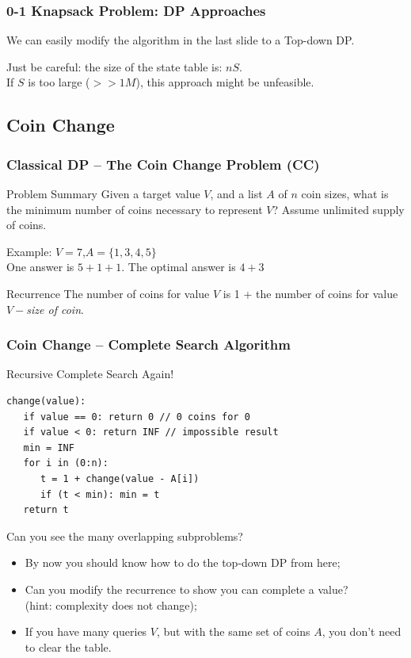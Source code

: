 \documentclass{beamer}
\begin{document}
\begin{frame}
  \frametitle{0-1 Knapsack Problem: DP Approaches} 

  {\small 
    We can easily modify the algorithm in the last slide to a Top-down
    DP.

    \bigskip

    \alert{Just be careful}: the size of the state table is: $nS$.\\ 
    If $S$ is too large ($>>1M$), this approach might be unfeasible.
  }
\end{frame}

\subsection{Coin Change}
\begin{frame}
  \frametitle{Classical DP -- The Coin Change Problem (CC)}
  \begin{block}{Problem Summary}
    Given a target value $V$, and a list $A$ of $n$ coin sizes, what
    is the minimum number of coins necessary to represent $V$? Assume
    unlimited supply of coins.
  \end{block}

  Example: $V = 7$,$A = \{1,3,4,5\}$\\
  \medskip
  One answer is $5+1+1$. The optimal answer is $4+3$

  \bigskip

  \begin{exampleblock}{Recurrence}
    The number of coins for value $V$ is 1 + the number of coins for
    value $V - $\emph{size of coin}.
  \end{exampleblock}
\end{frame}

\begin{frame}[fragile]
  \frametitle{Coin Change -- Complete Search Algorithm}
  {\smaller
  \begin{block}{Recursive Complete Search Again!}
\begin{verbatim}
change(value):
   if value == 0: return 0 // 0 coins for 0
   if value < 0: return INF // impossible result
   min = INF
   for i in (0:n):
      t = 1 + change(value - A[i])
      if (t < min): min = t
   return t
\end{verbatim}

\medskip

Can you see the many overlapping subproblems?
  \end{block}
\begin{itemize}
  \item By now you should know how to do the top-down DP from here;
  \item Can you modify the recurrence to show  you can complete a value?\\ 
    (hint: complexity does not change);
  \item If you have many queries $V$, but with the same set of coins
    $A$, you don't need to clear the table.
\end{itemize}


  }
\end{frame}
\end{document}
